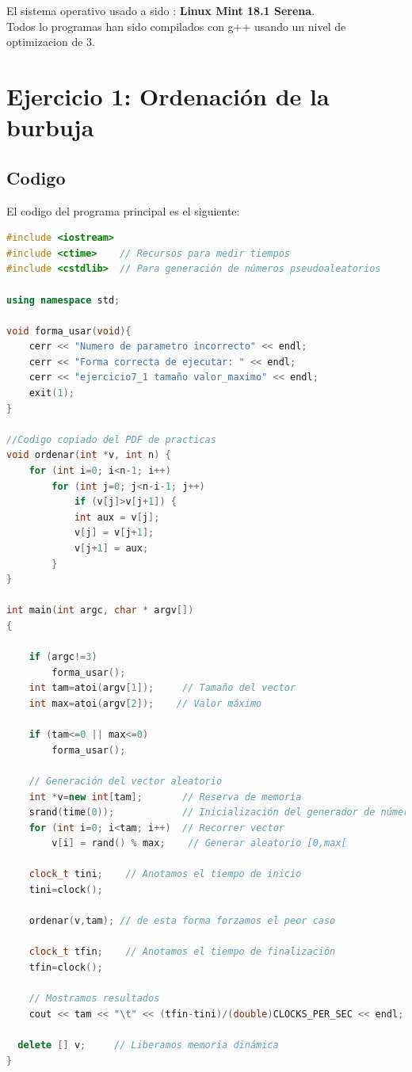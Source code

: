 \documentclass[12pt,a4psprt]{article}
\begin{document}
El sistema operativo usado a sido : \textbf{Linux Mint 18.1 Serena}.\\
Todos lo programas han sido compilados con g++ usando un nivel de optimizacion de 3.
\pagebreak
\section{Ejercicio 1: Ordenación de la burbuja}
\subsection{Codigo}
El codigo del programa principal es el siguiente:
\begin{lstlisting}[language=C++]
#include <iostream>
#include <ctime>    // Recursos para medir tiempos
#include <cstdlib>  // Para generación de números pseudoaleatorios

using namespace std;

void forma_usar(void){
	cerr << "Numero de parametro incorrecto" << endl;
	cerr << "Forma correcta de ejecutar: " << endl;
	cerr << "ejercicio7_1 tamaño valor_maximo" << endl;
	exit(1);
}

//Codigo copiado del PDF de practicas
void ordenar(int *v, int n) {
	for (int i=0; i<n-1; i++)
		for (int j=0; j<n-i-1; j++)
			if (v[j]>v[j+1]) {
			int aux = v[j];
			v[j] = v[j+1];
			v[j+1] = aux;
		}
}

int main(int argc, char * argv[])
{
  
	if (argc!=3)
		forma_usar();
	int tam=atoi(argv[1]);     // Tamaño del vector
	int max=atoi(argv[2]);    // Valor máximo
	
	if (tam<=0 || max<=0)
    	forma_usar();
  
	// Generación del vector aleatorio
	int *v=new int[tam];       // Reserva de memoria
	srand(time(0));            // Inicialización del generador de números pseudoaleatorios
	for (int i=0; i<tam; i++)  // Recorrer vector
		v[i] = rand() % max;    // Generar aleatorio [0,max[

	clock_t tini;    // Anotamos el tiempo de inicio
	tini=clock();

	ordenar(v,tam); // de esta forma forzamos el peor caso
  
	clock_t tfin;    // Anotamos el tiempo de finalización
	tfin=clock();

	// Mostramos resultados
	cout << tam << "\t" << (tfin-tini)/(double)CLOCKS_PER_SEC << endl;
  
  delete [] v;     // Liberamos memoria dinámica
}
\end{lstlisting}
\end{document}
